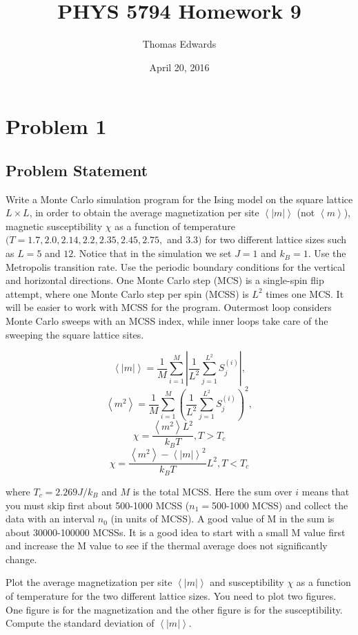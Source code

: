 \documentclass[10pt,letter]{article}
\begin{document}
\begin{titlepage}
\title{PHYS 5794 Homework 9}
\date{April 20, 2016}
\author{Thomas Edwards}
\maketitle
\end{titlepage}

\section{Problem 1}

\subsection{Problem Statement}
Write a Monte Carlo simulation program for the Ising model on the square lattice $L \times L$, in order to
obtain the average magnetization per site $\left< |m| \right>$ (not $\left<m\right>$), magnetic susceptibility $\chi$ as a function of
temperature $(T =1.7, 2.0, 2.14, 2.2, 2.35, 2.45, 2.75,$ and $3.3)$ for two different lattice sizes such as
$L =5$ and $12$. Notice that in the simulation we set $J = 1$ and $k_B = 1$. Use the Metropolis transition
rate. Use the periodic boundary conditions for the vertical and horizontal directions. One Monte
Carlo step (MCS) is a single-spin flip attempt, where one Monte Carlo step per spin (MCSS) is $L^2$
times one MCS. It will be easier to work with MCSS for the program. Outermost loop considers
Monte Carlo sweeps with an MCSS index, while inner loops take care of the sweeping the square
lattice sites.

$$ \left< |m| \right> = \frac{1}{M} \sum_{i=1}^M\left| \frac{1}{L^2} \sum_{j=1}^{L^2}S_j^{(i)}\right|, $$
$$\left< m^2 \right> = \frac{1}{M} \sum_{i=1}^M\left( \frac{1}{L^2} \sum_{j=1}^{L^2}S_j^{(i)}\right)^2, $$
$$\chi = \frac{\left< m^2 \right> L^2}{k_BT},T > T_c $$
$$\chi = \frac{\left< m^2 \right>-\left< |m| \right>^2}{k_BT} L^2,T < T_c $$

where $T_c = 2.269J/k_B$ and $M$ is the total MCSS. Here the sum over $i$ means that you must skip first
about 500-1000 MCSS ($n_1 =$500-1000 MCSS) and collect the data with an interval $n_0$ (in units of
MCSS). A good value of M in the sum is about 30000-100000 MCSSs. It is a good idea to start with
a small M value first and increase the M value to see if the thermal average does not significantly
change.

Plot the average magnetization per site $\left< |m| \right>$ and susceptibility $\chi$ as a function of temperature for
the two different lattice sizes. You need to plot two figures. One figure is for the magnetization and
the other figure is for the susceptibility. Compute the standard deviation of $\left< |m| \right>$.
\end{document}
